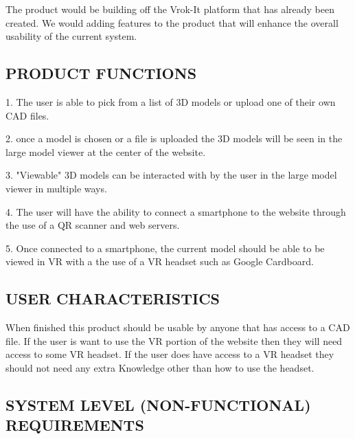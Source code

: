\documentclass[letterpaper, 10pt, draftclsnofoot, onecolumn]{IEEEtran}
\begin{document}
{\color{black}

{\color{black}
The product would be building off the Vrok-It platform that has already been created. We would adding features to the product that will enhance the overall usability of the current system.    }

\subsection[PRODUCT
FUNCTIONS]{\rmfamily\bfseries\color{black}
PRODUCT FUNCTIONS}

{\color{black}
1.	The user is able to pick from a list of 3D models or upload one of their own CAD files.

2.	once a model is chosen or a file is uploaded the 3D models will be seen in the large model viewer at the 
	center of the website.

3.	"Viewable" 3D models can be interacted with by the user in the large model viewer in multiple ways.

4.	The user will have the ability to connect a smartphone to the website through the use of a QR scanner
	and web servers. 

5.	Once connected to a smartphone, the current model should be able to be viewed in VR with a the use
	of a VR headset such as Google Cardboard. 
}

\subsection[USER
CHARACTERISTICS]{\rmfamily\bfseries\color{black}
USER CHARACTERISTICS}

{\color{black}
When finished this product should be usable by anyone that has access to a CAD file. If the user is want to use the VR 
portion of the website then they will need access to some VR headset. If the user does have access to a VR headset they 
should not need any extra Knowledge other than how to use the headset.  }


\subsection[SYSTEM LEVEL (NON{}-FUNCTIONAL)
REQUIREMENTS]{\rmfamily\bfseries\color{black}
SYSTEM LEVEL (NON-FUNCTIONAL) REQUIREMENTS}

}
\end{document}
